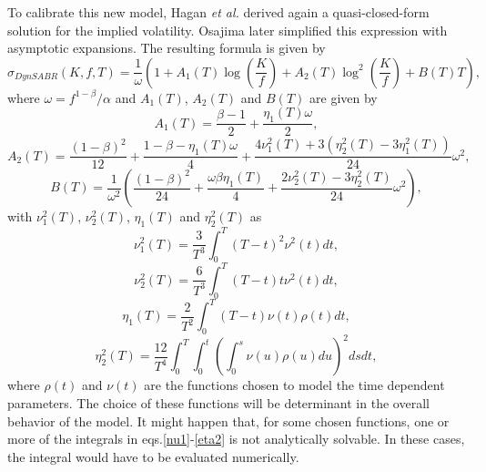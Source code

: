 To calibrate this new model, Hagan \textit{et al.} derived again a quasi-closed-form solution for the implied volatility. Osajima later simplified this expression with asymptotic expansions. The resulting formula is given by
\begin{equation}
\sigma_{DynSABR}(K,f,T)=\frac{1}{\omega}\left(1+A_1(T)\log\left(\frac{K}{f}\right)+A_2(T)\log^2\left(\frac{K}{f}\right)+B(T)T\right),
\end{equation}
\noindent where $\omega=f^{1-\beta}/\alpha$ and $A_1(T)$, $A_2(T)$ and $B(T)$ are given by
\begin{equation}
A_1(T)=\frac{\beta-1}{2}+\frac{\eta_1(T)\omega}{2},
\end{equation}
\begin{equation}
A_2(T)=\frac{(1-\beta)^2}{12}+\frac{1-\beta-\eta_1(T)\omega}{4}+\frac{4\nu_1^2(T)+3(\eta_2^2(T)-3\eta_1^2(T))}{24}\omega^2,
\end{equation}
\begin{equation}
B(T)=\frac{1}{\omega^2}\left(\frac{(1-\beta)^2}{24}+\frac{\omega\beta\eta_1(T)}{4}+\frac{2\nu_2^2(T)-3\eta_2^2(T)}{24}\omega^2\right),
\end{equation}
\noindent with $\nu_1^2(T)$, $\nu_2^2(T)$, $\eta_1(T)$ and $\eta_2^2(T)$ as
\begin{equation}\label{nu1}
\nu_1^2(T)=\frac{3}{T^3}\int_0^T(T-t)^2\nu^2(t)dt,
\end{equation}
\begin{equation}
\nu_2^2(T)=\frac{6}{T^3}\int_0^T(T-t)t\nu^2(t)dt,
\end{equation}
\begin{equation}
\eta_1(T)=\frac{2}{T^2}\int_0^T(T-t)\nu(t)\rho(t)dt,
\end{equation}
\begin{equation}\label{eta2}
\eta_2^2(T)=\frac{12}{T^4}\int_0^T\int_0^t\left(\int_0^s\nu(u)\rho(u)du\right)^2dsdt,
\end{equation}
\noindent where $\rho(t)$ and $\nu(t)$ are the functions chosen to model the time dependent parameters.
The choice of these functions will be determinant in the overall behavior  of the model. It might happen that, for some chosen functions, one or more of the integrals in eqs.\eqref{nu1}-\eqref{eta2} is not analytically  solvable. In these cases, the integral would have to be evaluated numerically.

